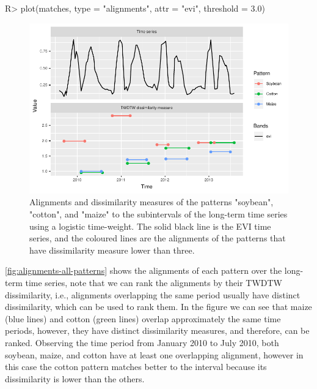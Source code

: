 \documentclass[article,shortnames]{jss}
\begin{document}
\begin{CodeChunk}

\begin{CodeInput}
R> plot(matches, type = "alignments", attr = "evi", threshold = 3.0)
\end{CodeInput}
\begin{figure}[!h]

{\centering \includegraphics{dtwSat_files/figure-latex/alignments-all-patterns-1} 

}

\caption[Alignments and dissimilarity measures of the patterns "soybean", "cotton", and "maize" to the subintervals of the long-term time series using a logistic time-weight]{Alignments and dissimilarity measures of the patterns "soybean", "cotton", and "maize" to the subintervals of the long-term time series using a logistic time-weight. The solid black line is the EVI time series, and the coloured lines are the alignments of the patterns that have dissimilarity measure lower than three.}\label{fig:alignments-all-patterns}
\end{figure}
\end{CodeChunk}

\autoref{fig:alignments-all-patterns} shows the alignments of each
pattern over the long-term time series, note that we can rank the
alignments by their TWDTW dissimilarity, i.e., alignments overlapping
the same period usually have distinct dissimilarity, which can be used
to rank them. In the figure we can see that maize (blue lines) and
cotton (green lines) overlap approximately the same time periods,
however, they have distinct dissimilarity measures, and therefore, can
be ranked. Observing the time period from January 2010 to July 2010,
both soybean, maize, and cotton have at least one overlapping alignment,
however in this case the cotton pattern matches better to the interval
because its dissimilarity is lower than the others.
\end{document}
